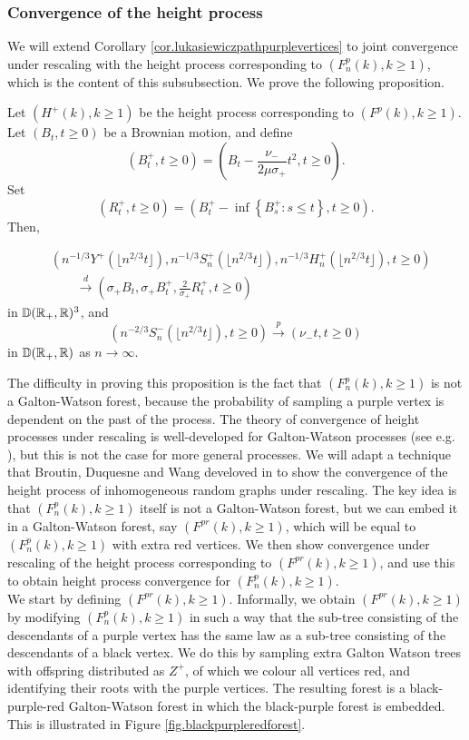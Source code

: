 \subsubsection{Convergence of the height process}\label{subsubsec.convheightprocess}
We will extend Corollary \ref{cor.lukasiewiczpathpurplevertices} to joint convergence under rescaling with the height process corresponding to $(F^p_n(k),k\geq 1)$, which is the content of this subsubsection. We prove the following proposition. 
\begin{proposition}\label{prop.convheightprocesspurple}
Let $(H^{+}(k),k\geq 1)$ be the height process corresponding to $(F^p(k),k\geq 1)$. Let $(B_t,t\geq 0)$ be a Brownian motion, and define 
$$({B}^+_t,t\geq 0)=\left(B_t-\frac{\nu_-}{2\mu\sigma_+}t^2,t\geq 0\right).$$ 
Set $$(R^+_t,t\geq 0)=\left({B}^+_t-\inf\left\{{B}^+_s: s\leq t\right\},t\geq 0 \right).$$
Then,

\begin{align*}&\left(n^{-1/3}Y^{+}\left(\lfloor n^{2/3}t\rfloor\right), n^{-1/3}S^{+}_n\left(\lfloor n^{2/3}t\rfloor\right),n^{-1/3}H^{+}_n\left(\lfloor n^{2/3}t\rfloor\right), t\geq 0\right) \\
&\qquad \overset{d}{\to}\left(\sigma_+B_t,\sigma_+{B}^+_t, \frac{2}{\sigma_+} R^+_t,  t\geq 0\right)\end{align*}
 in ${\mathbb D}({\mathbb R}_+,{\mathbb R})^3$, and 
 $$\left(n^{-2/3}S^{-}_n\left(\lfloor n^{2/3}t\rfloor\right),t\geq 0\right)\overset{p}{\to}\left(\nu_- t,t\geq 0\right)$$
 in ${\mathbb D}({\mathbb R}_+,{\mathbb R})$ as $n\to\infty$.
\end{proposition}

The difficulty in proving this proposition is the fact that $(F^p_n(k),k\geq 1)$ is not a Galton-Watson forest, because the probability of sampling a purple vertex is dependent on the past of the process. The theory of convergence of height processes under rescaling is well-developed for Galton-Watson processes (see e.g. \cite{AST_2002__281__R1_0}), but this is not the case for more general processes.  We will adapt a technique that Broutin, Duquesne and Wang develoved in \cite{broutinLimitsMultiplicativeInhomogeneous2020} to show the convergence of the height process of inhomogeneous random graphs under rescaling. The key idea is that  $(F^p_n(k),k\geq 1)$ itself is not a Galton-Watson forest, but we can embed it in a Galton-Watson forest, say $(F^{pr}(k),k\geq 1)$, which will be equal to $(F^p_n(k),k\geq 1)$ with extra red vertices. We then show convergence under rescaling of the height process corresponding to $(F^{pr}(k),k\geq 1)$, and use this to obtain height process convergence for $(F^p_n(k),k\geq 1)$. \\
We start by defining $(F^{pr}(k),k\geq 1)$. Informally, we obtain $(F^{pr}(k),k\geq 1)$ by modifying $(F^p_n(k),k\geq 1)$ in such a way that the sub-tree consisting of the descendants of a purple vertex has the same law as a sub-tree consisting of the descendants of a black vertex. We do this by sampling extra Galton Watson trees with offspring distributed as $Z^+$, of which we colour all vertices red, and identifying their roots with the purple vertices. The resulting forest is a black-purple-red Galton-Watson forest in which the black-purple forest is embedded. This is illustrated in Figure \ref{fig.blackpurpleredforest}. 

